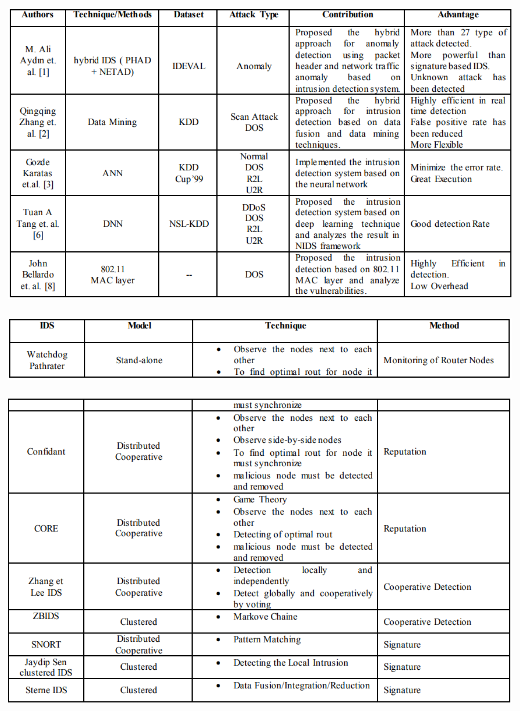 \documentclass[conference]{IEEEtran}
\begin{document}
\begin{center}
\includegraphics[width=.5\textwidth]{gambar/a.PNG}
\end{center}

\begin{center}
\includegraphics[width=.5\textwidth]{gambar/b.PNG}
\end{center}

\begin{center}
\includegraphics[width=.5\textwidth]{gambar/c.PNG}
\end{center}




\end{document}
